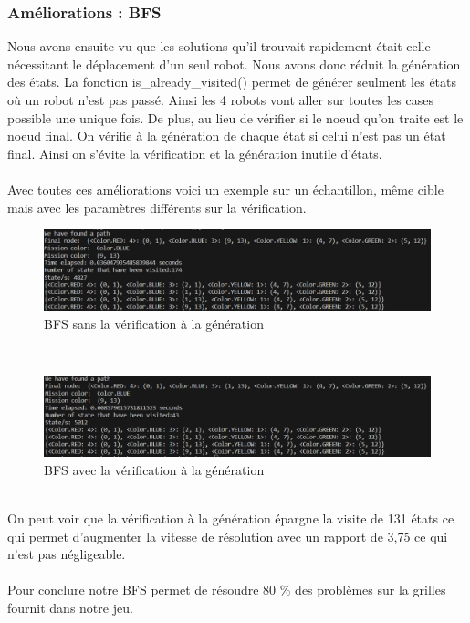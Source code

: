 \documentclass{article}
\begin{document}
\subsubsection{Améliorations : BFS}
Nous avons ensuite vu que les solutions qu'il trouvait rapidement était celle nécessitant le déplacement d'un seul robot. Nous avons donc réduit la génération des états. La fonction is\_already\_visited() permet de générer seulment les états où un robot n'est pas passé. Ainsi les 4 robots vont aller sur toutes les cases possible une unique fois. De plus, au lieu de vérifier si le noeud qu'on traite est le noeud final. On vérifie à la génération de chaque état si celui n'est pas un état final. Ainsi on s'évite la vérification et la génération inutile d'états.\\\\
Avec toutes ces améliorations voici un exemple sur un échantillon, même cible mais avec les paramètres différents sur la vérification.
\begin{figure}[!h]
  \centering  
  \includegraphics[width=1\textwidth]{sans_verif_generation.png}  
  \caption{BFS sans la vérification à la génération} 
  \label{fig:Diagram}  
\end{figure}\\
\begin{figure}[!h]
  \centering  
  \includegraphics[width=1\textwidth]{avec_verif_generation.png}  
  \caption{BFS avec la vérification à la génération} 
  \label{fig:Diagram}  
\end{figure}\\
On peut voir que la vérification à la génération épargne la visite de 131 états ce qui permet d'augmenter la vitesse de résolution avec un rapport de 3,75 ce qui n'est pas négligeable.\\\\
Pour conclure notre BFS permet de résoudre 80 \% des problèmes sur la grilles fournit dans notre jeu.
\end{document}
